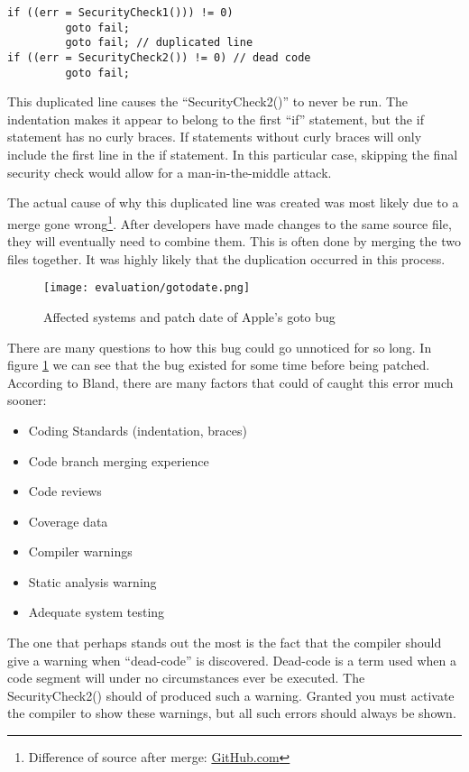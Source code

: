 \begin{lstlisting}[style=myScalastyle]
if ((err = SecurityCheck1())) != 0)
         goto fail;
         goto fail; // duplicated line
if ((err = SecurityCheck2()) != 0) // dead code
         goto fail;
\end{lstlisting}

This duplicated line causes the ``SecurityCheck2()'' to never be run. The indentation makes it appear to belong to the first ``if'' statement, but the if statement has no curly braces. If statements without curly braces will only include the first line in the if statement.  In this particular case, skipping the final security check would allow for a man-in-the-middle attack.

The actual cause of why this duplicated line was created was most likely due to a merge gone wrong\footnote{Difference of source after merge: \href{https://gist.github.com/hongrich/9176925}{GitHub.com}}. After developers have made changes to the same source file, they will eventually need to combine them. This is often done by merging the two files together. It was highly likely that the duplication occurred in this process.
\begin{figure}[H]
  \centering
  \texttt{[image: evaluation/gotodate.png]}
  \caption{Affected systems and patch date of Apple's goto bug \cite{bland2014finding}}
  \label{fig:gotofail}
\end{figure}

There are many questions to how this bug could go unnoticed for so long. In figure \ref{fig:gotofail} we can see that the bug existed for some time before being patched. According to Bland, there are many factors that could of caught this error much sooner:
\begin{itemize}
  \item Coding Standards (indentation, braces)
  \item Code branch merging experience
  \item Code reviews
  \item Coverage data
  \item Compiler warnings
  \item Static analysis warning
  \item Adequate system testing
\end{itemize}

The one that perhaps stands out the most is the fact that the compiler should give a warning when ``dead-code'' is discovered. Dead-code is a term used when a code segment will under no circumstances ever be executed. The SecurityCheck2() should of produced such a warning. Granted you must activate the compiler to show these warnings, but all such errors should always be shown.

